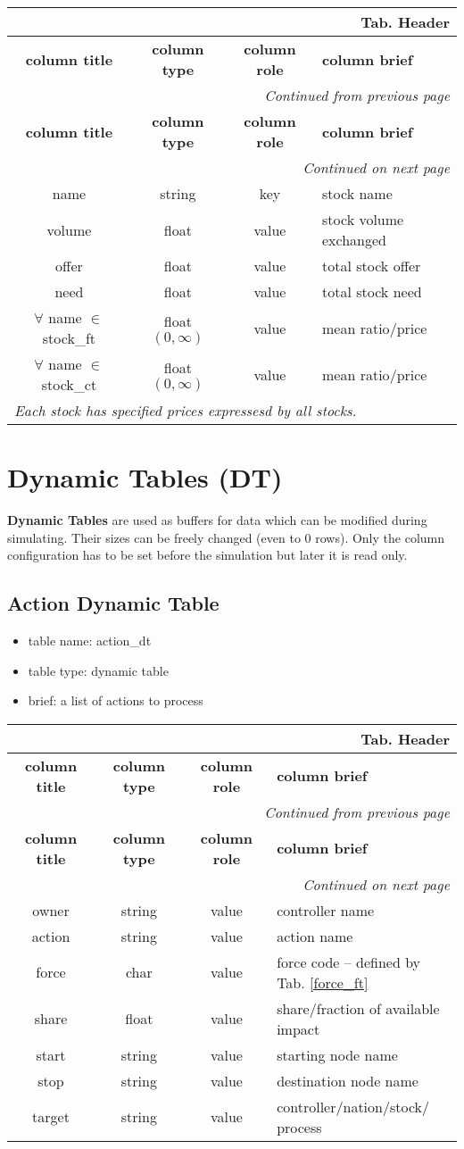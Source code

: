 \documentclass[a4paper,oneside,titlepage]{report}
\newcommand*{\LTHeaderIV}[5]{
  \multicolumn{4}{r}{\textbf{Tab. \thesubsection} \textbf{#1}}\\    
  \hline
  \textbf{#2} & \textbf{#3} & \textbf{#4} & \textbf{#5}\\
  \hline
  
  \endfirsthead
  \multicolumn{4}{r}{\textit{Continued from previous page}}\\    
  \hline
  \textbf{#2} & \textbf{#3} & \textbf{#4} & \textbf{#5}\\
  \hline
  \endhead
  \hline
  \multicolumn{4}{r}{\textit{Continued on next page}}\\
  \endfoot
  \hline
  \endlastfoot  
}
\begin{document}
\vspace{-0.5cm}
\begin{longtable}{ |c|c|c|l| } 
  \LTHeaderIV{Header}{column title}{column type}{column role}{column brief}                    
  name & string & key & stock name\\
  volume & float & value & stock volume exchanged\\
  offer & float & value & total stock offer\\
  need & float & value & total stock need\\
  $\forall$ name $\in$ stock\_ft & float $(0, \infty)$ & value & mean ratio$/$price\\
  $\forall$ name $\in$ stock\_ct & float $(0, \infty)$ & value & mean ratio$/$price\\
  \multicolumn{4}{|l|}{\textit{Each stock has specified prices expressesd by all stocks.}}\\
\end{longtable}        

\section{Dynamic Tables (DT)}
\textbf{Dynamic Tables} are used as buffers for data which can be modified during simulating. Their sizes can be freely changed (even to 0 rows). Only the column configuration has to be set before the simulation but later it is read only. 

\subsection{Action Dynamic Table}
\begin{itemize}
  \setlength{\itemsep}{0pt}
  \setlength{\parskip}{0pt}
\item table name: action\_dt  
\item table type: dynamic table   
\item brief: a list of actions to process
\end{itemize}

\vspace{-0.5cm}
\begin{longtable}{ |c|c|c|l| } 
  \LTHeaderIV{Header}{column title}{column type}{column role}{column brief}                    
  owner & string & value & controller name \\
  action & string & value & action name\\
  force & char & value & force code -- defined by Tab. \ref{force_ft}\\
  share & float & value & share$/$fraction of available impact\\
  start & string & value & starting node name\\
  stop & string & value & destination node name\\
  target & string & value & controller$/$nation$/$stock$/$process \\
\end{longtable}        
\end{document}
